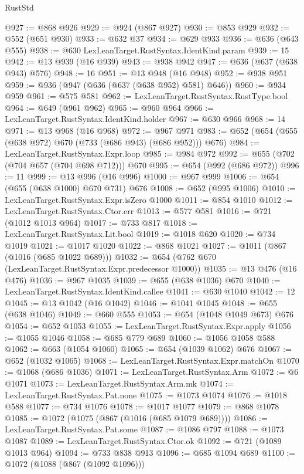 \begin{lexlean}{RustStd}
\begin{coremodule}
@927 := @868 @926
@929 := @924 (@867 @927)
@930 := @853 @929
@932 := @552 (@651 @930)
@933 := @632 @37
@934 := @629 @933
@936 := @636 (@643 @555)
@938 := @630 LexLeanTarget.RustSyntax.IdentKind.param
@939 := 15
@942 := @13 @939 (@16 @939)
@943 := @938 @942
@947 := @636 (@637 (@638 @943) @576)
@948 := 16
@951 := @13 @948 (@16 @948)
@952 := @938 @951
@959 := @936 (@947 (@636 (@637 (@638 @952) @581) @646))
@960 := @934 @959
@961 := @575 @581
@962 := LexLeanTarget.RustSyntax.RustType.bool
@964 := @649 (@961 @962)
@965 := @960 @964
@966 := LexLeanTarget.RustSyntax.IdentKind.holder
@967 := @630 @966
@968 := 14
@971 := @13 @968 (@16 @968)
@972 := @967 @971
@983 := @652 (@654 (@655 (@638 @972) @670 (@733 (@686 @943) (@686 @952))) @676)
@984 := LexLeanTarget.RustSyntax.Expr.loop
@985 := @984 @972
@992 := @655 (@702 (@704 @657 (@704 @698 @712))) @670
@995 := @654 (@992 (@686 @972))
@996 := 11
@999 := @13 @996 (@16 @996)
@1000 := @967 @999
@1006 := @654 (@655 (@638 @1000) @670 @731) @676
@1008 := @652 (@995 @1006)
@1010 := LexLeanTarget.RustSyntax.Expr.isZero @1000
@1011 := @854 @1010
@1012 := LexLeanTarget.RustSyntax.Ctor.err
@1013 := @577 @581
@1016 := @721 (@1012 @1013 @964)
@1017 := @733 @817
@1018 := LexLeanTarget.RustSyntax.Lit.bool
@1019 := @1018 @620
@1020 := @734 @1019
@1021 := @1017 @1020
@1022 := @868 @1021
@1027 := @1011 (@867 (@1016 (@685 @1022 @689)))
@1032 := @654 (@762 @670 (LexLeanTarget.RustSyntax.Expr.predecessor @1000))
@1035 := @13 @476 (@16 @476)
@1036 := @967 @1035
@1039 := @655 (@638 @1036) @670
@1040 := LexLeanTarget.RustSyntax.IdentKind.callee
@1041 := @630 @1040
@1042 := 12
@1045 := @13 @1042 (@16 @1042)
@1046 := @1041 @1045
@1048 := @655 (@638 @1046)
@1049 := @660 @555
@1053 := @654 (@1048 @1049 @673) @676
@1054 := @652 @1053
@1055 := LexLeanTarget.RustSyntax.Expr.apply
@1056 := @1055 @1046
@1058 := @685 @779 @689
@1060 := @1056 @1058 @588
@1062 := @663 (@1054 @1060)
@1065 := @654 (@1039 @1062) @676
@1067 := @652 (@1032 @1065)
@1068 := LexLeanTarget.RustSyntax.Expr.matchOn
@1070 := @1068 (@686 @1036)
@1071 := LexLeanTarget.RustSyntax.Arm
@1072 := @6 @1071
@1073 := LexLeanTarget.RustSyntax.Arm.mk
@1074 := LexLeanTarget.RustSyntax.Pat.none
@1075 := @1073 @1074
@1076 := @1018 @588
@1077 := @734 @1076
@1078 := @1017 @1077
@1079 := @868 @1078
@1085 := @1072 (@1075 (@867 (@1016 (@685 @1079 @689))))
@1086 := LexLeanTarget.RustSyntax.Pat.some
@1087 := @1086 @797
@1088 := @1073 @1087
@1089 := LexLeanTarget.RustSyntax.Ctor.ok
@1092 := @721 (@1089 @1013 @964)
@1094 := @733 @838 @913
@1096 := @685 @1094 @689
@1100 := @1072 (@1088 (@867 (@1092 @1096)))

\end{coremodule}
\end{lexlean}
